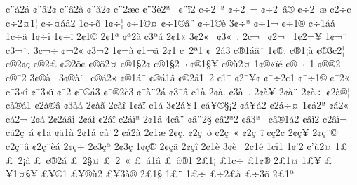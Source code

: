 {^^a2^^a8^^e12^^e1
^^a2^^a8^^e22^^a2
^^a2^^a8^^e22^^e0
^^a2^^a8^^e52^^a2
^^a2^^a82^^e6^^a2
^^a2^^a83^^e82^^aa^^a0
^^a2^^a8^^ef2
^^a2^^f72^^a0^^aa
^^a2^^f72^^a0^^ac
^^a2^^f72^^a0^^e2^^ae
^^a2^^f72^^a0^^e6
^^a22^^f7^^a2
^^a2^^f72^^a41^^a6
^^a2^^f7^^a4^^e1^^e22
1^^a2^^f7^^f5
1^^a2^^f7^^a6
^^a2^^f71^^a9^^a4
^^a2^^f71^^a9^^e2^^a8
^^a2^^f71^^a9^^e8
3^^a2^^f7^^aa
^^a2^^f71^^ac
^^a2^^f71^^ae
^^a2^^f71^^e1^^e1
1^^a2^^f7^^e3
1^^a2^^f7^^ee
1^^a2^^f7^^ef
2^^a21^^a9
2^^a21^^aa
^^a2^^aa2^^e0
^^a23^^aa^^e1
2^^a21^^ab
3^^a22^^ab^^a0
^^a23^^ab^^a0.
2^^a2^^ac^^a0
^^a22^^ac^^a0^^ad
1^^a22^^ac^^a5
1^^a2^^ac^^a8
^^a23^^ac^^a8.
3^^a2^^ac^^f7
^^a2^^ac2^^ab
^^a23^^ac2^^ad
1^^a2^^ac^^e0
^^a21^^ac^^e3
2^^a21^^ad
^^a2^^ad^^a02^^aa1
^^a2^^ad^^a02^^e13
^^a2^^ad^^ae1^^e1^^e2^^a8
1^^a2^^ae.
^^a2^^ae1^^a1^^e0
^^a2^^ae3^^a22^^a6
^^a2^^ae2^^a2^^e7
^^a2^^ae2^^a3^^ad
^^a2^^ae2^^f5^^a2
^^a2^^ae^^f52^^a4
^^a2^^ae1^^a72^^a2
^^a2^^ae1^^a72^^ac
^^a2^^ae1^^a7^^ad^^a5
^^a2^^ae^^f92^^a4
1^^a2^^ae^^ab^^ef^^e9
^^a2^^ae^^ac^^a01
^^a2^^ae^^ae2
^^a2^^ae^^af2
3^^a2^^ae^^e0^^a0
3^^a2^^ae^^e0^^a8.
^^a2^^ae^^e12^^ab
^^a2^^ae1^^e1^^af
^^a2^^ae^^e11^^e2
^^a2^^ae2^^e51^^a02
^^a21^^af
^^a22^^af^^a5^^a2
^^a2^^af^^f72^^a21
^^a2^^af^^f71^^a9
^^a2^^af2^^ab
^^a2^^af3^^ab^^ee
^^a2^^af3^^ab^^ef
^^a2^^af2^^ad
^^a2^^af^^ae^^e13
^^a2^^af^^ae2^^e83
^^a2^^af^^e0^^a82^^e1^^ad
^^a23^^af^^e2
^^a21^^e0
2^^a2^^e0.
^^a23^^e0^^a0.
2^^a2^^e0^^a5
2^^a2^^e0^^a8
2^^a2^^e0^^f7
^^a22^^e0^^ae^^a6
^^a2^^e0^^ae^^e11
^^a22^^e0^^ae^^e2
^^a23^^e0^^e1
2^^a2^^e0^^e3
2^^a2^^e0^^ee
1^^a2^^e0^^ef
^^a21^^e1
3^^a22^^e1^^a51
^^a2^^e1^^a5^^ae^^a7^^a12
^^a2^^e1^^a5^^e12
^^a22^^e1^^f7^^a4
1^^a2^^e12^^aa
^^a2^^e12^^ab
^^a2^^e12^^ac
2^^a2^^e1^^ad
2^^a22^^e1^^e2^^ec
2^^a2^^e1^^ec
^^a22^^e1^^ee
^^a22^^e1^^ef^^aa
2^^a21^^e2
4^^a2^^e2^^a8
^^a2^^e2^^a82^^a7
^^a2^^e22^^aa2
^^a2^^e23^^aa^^a0
^^a2^^e2^^ae1^^e12
^^a2^^e2^^ec2
^^a22^^e2^^ef^^ac
^^a2^^e32^^e7^^a0^^e1
^^a21^^e4
^^a2^^e41^^e0
2^^a21^^e5
^^a2^^e5^^a82
^^a2^^e52^^e0
2^^a21^^e6
2^^a2^^e7.
^^a22^^e7^^a0^^f5
^^a22^^e7^^a0^^ab
^^a22^^e7^^a0^^ee
^^a2^^e72^^a2
2^^a2^^e7^^a5
2^^a2^^e7^^a8^^a9
^^a22^^e7^^a8^^e2
^^a22^^e7^^a8^^e8^^e1
2^^a2^^e7^^f7
2^^a23^^e7^^aa
2^^a23^^e7^^ad
1^^a2^^e7^^ae
2^^a2^^e7^^e3
2^^a2^^e7^^ee
2^^a21^^e8
3^^a2^^e8^^af
2^^a21^^e9
1^^a2^^ee1
1^^a2'2
^^a2'^^f92^^a4
1^^a3^^a0
^^a3^^a02^^a1^^e0
^^a3^^a0^^a2^^ae2^^e1
^^a3^^a02^^a7^^a4
^^a3^^a02^^af^^ab
^^a3^^a0^^e11^^e2
^^a3^^a0^^e2^^ae1
2^^a31^^a1
^^a31^^a2^^f7
^^a31^^a2^^ae
2^^a31^^a4
1^^a3^^a5
^^a3^^a51^^a4^^a7^^a5
^^a3^^a5^^ad^^ae1
^^a3^^a5^^ae^^f92
^^a3^^a53^^e0^^ae
2^^a31^^a7
1^^a3^^a8
1^^a3^^f7
^^a3^^f72^^a3^^e0
^^a3^^f73^^f5
2^^a31^^aa
}
